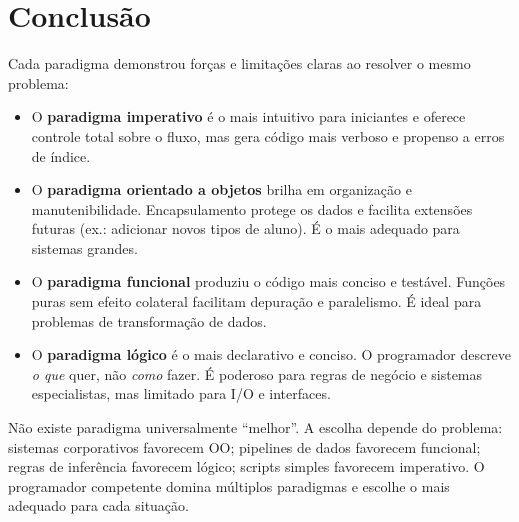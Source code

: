 \documentclass[12pt, a4paper]{article}
\begin{document}
\section{Conclusão}

Cada paradigma demonstrou forças e limitações claras ao resolver o mesmo problema:

\begin{itemize}
    \item O \textbf{paradigma imperativo} é o mais intuitivo para iniciantes e oferece controle total sobre o fluxo, mas gera código mais verboso e propenso a erros de índice.

    \item O \textbf{paradigma orientado a objetos} brilha em organização e manutenibilidade. Encapsulamento protege os dados e facilita extensões futuras (ex.: adicionar novos tipos de aluno). É o mais adequado para sistemas grandes.

    \item O \textbf{paradigma funcional} produziu o código mais conciso e testável. Funções puras sem efeito colateral facilitam depuração e paralelismo. É ideal para problemas de transformação de dados.

    \item O \textbf{paradigma lógico} é o mais declarativo e conciso. O programador descreve \textit{o que} quer, não \textit{como} fazer. É poderoso para regras de negócio e sistemas especialistas, mas limitado para I/O e interfaces.
\end{itemize}

Não existe paradigma universalmente ``melhor''. A escolha depende do problema: sistemas corporativos favorecem OO; pipelines de dados favorecem funcional; regras de inferência favorecem lógico; scripts simples favorecem imperativo. O programador competente domina múltiplos paradigmas e escolhe o mais adequado para cada situação.
\end{document}
